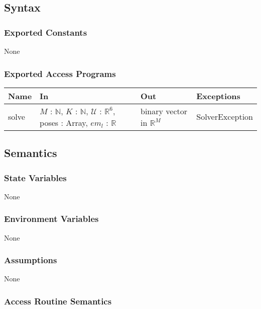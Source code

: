 \documentclass[12pt, titlepage]{article}
\begin{document}
\subsection{Syntax}

\subsubsection{Exported Constants}
None

\subsubsection{Exported Access Programs}

\begin{center}
  \begin{tabular}{p{3cm} p{4cm} p{4cm} p{3cm}}
  \hline
  \textbf{Name} & \textbf{In} & \textbf{Out} & \textbf{Exceptions} \\
  \hline
  solve & $M$ : $\mathbb{N}$, $K$ : $\mathbb{N}$, $\mathcal{U}$ : $\mathbb{R}^{6}$, poses : Array, $em_l$ : $\mathbb{R}$ & binary vector in $\mathbb{R}^M$ & SolverException \\
  \hline
  \end{tabular}
  \end{center}

\subsection{Semantics}

\subsubsection{State Variables}
None

\subsubsection{Environment Variables}
None 

\subsubsection{Assumptions}
None

\subsubsection{Access Routine Semantics}
\end{document}
